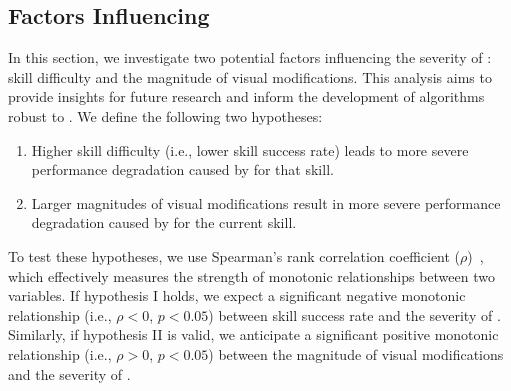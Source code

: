 \subsection{Factors Influencing \pb}
\label{sec:factors}


In this section, we investigate two potential factors influencing the severity of \pb: skill difficulty and the magnitude of visual modifications. This analysis aims to provide insights for future research and inform the development of algorithms robust to \pb. We define the following two hypotheses:

\begin{enumerate}[I:]
    \item Higher skill difficulty (i.e., lower skill success rate) leads to more severe performance degradation caused by \pb for that skill.
    \item Larger magnitudes of visual modifications result in more severe performance degradation caused by \pb for the current skill.
\end{enumerate}

To test these hypotheses, we use Spearman's rank correlation coefficient ($\rho$)~\cite{spearman1961proof}, which effectively measures the strength of monotonic relationships between two variables. If hypothesis I holds, we expect a significant negative monotonic relationship (i.e., $\rho < 0$, $p < 0.05$) between skill success rate and the severity of \pb. Similarly, if hypothesis II is valid, we anticipate a significant positive monotonic relationship (i.e., $\rho > 0$, $p < 0.05$) between the magnitude of visual modifications and the severity of \pb.



